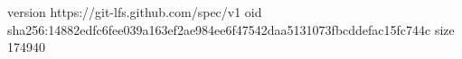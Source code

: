version https://git-lfs.github.com/spec/v1
oid sha256:14882edfc6fee039a163ef2ae984ee6f47542daa5131073fbcddefac15fc744c
size 174940
